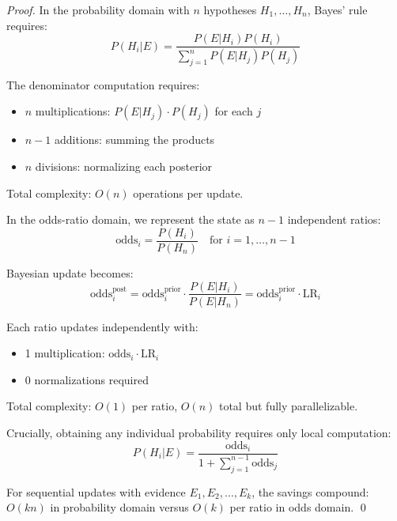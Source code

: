 \documentclass[11pt]{article}
\theoremstyle{definition}
\begin{document}
\begin{proof}
In the probability domain with $n$ hypotheses $H_1, \ldots, H_n$, Bayes' rule requires:
\begin{equation}
P(H_i|E) = \frac{P(E|H_i)P(H_i)}{\sum_{j=1}^n P(E|H_j)P(H_j)}
\end{equation}

The denominator computation requires:
\begin{itemize}
\item $n$ multiplications: $P(E|H_j) \cdot P(H_j)$ for each $j$
\item $n-1$ additions: summing the products
\item $n$ divisions: normalizing each posterior
\end{itemize}
Total complexity: $O(n)$ operations per update.

In the odds-ratio domain, we represent the state as $n-1$ independent ratios:
\begin{equation}
\text{odds}_i = \frac{P(H_i)}{P(H_n)} \quad \text{for } i = 1, \ldots, n-1
\end{equation}

Bayesian update becomes:
\begin{equation}
\text{odds}_i^{\text{post}} = \text{odds}_i^{\text{prior}} \cdot \frac{P(E|H_i)}{P(E|H_n)} = \text{odds}_i^{\text{prior}} \cdot \text{LR}_i
\end{equation}

Each ratio updates independently with:
\begin{itemize}
\item 1 multiplication: $\text{odds}_i \cdot \text{LR}_i$
\item 0 normalizations required
\end{itemize}
Total complexity: $O(1)$ per ratio, $O(n)$ total but fully parallelizable.

Crucially, obtaining any individual probability requires only local computation:
\begin{equation}
P(H_i|E) = \frac{\text{odds}_i}{1 + \sum_{j=1}^{n-1} \text{odds}_j}
\end{equation}

For sequential updates with evidence $E_1, E_2, \ldots, E_k$, the savings compound: $O(kn)$ in probability domain versus $O(k)$ per ratio in odds domain. \qed
\end{proof}
\end{document}
